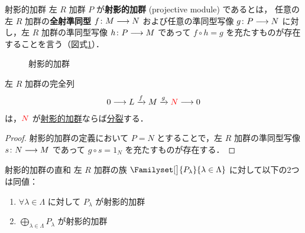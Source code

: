 \documentclass[rep_main]{subfiles}
\begin{document}

\begin{mydef}[label=def:proj-mod]{射影的加群}
    左 $R$ 加群 $P$ が\textbf{射影的加群} (projective module) であるとは，
    任意の左 $R$ 加群の\textbf{全射準同型} $f\colon M \longrightarrow N$ および任意の準同型写像 $g \colon P \longrightarrow N$ に対し，左 $R$ 加群の準同型写像 $ h \colon P \longrightarrow M$ であって $f \circ h = g$ を充たすものが存在することを言う（図式\ref{fig:proj-mod}）．
\end{mydef}

\begin{figure}[H]
    \centering
    \caption{射影的加群}
    \label{fig:proj-mod}
\end{figure}%

\begin{myprop}[label=prop:proj-mod-split]{}
    左 $R$ 加群の完全列
    \begin{align}
        0 \longrightarrow L \xrightarrow{f} M \xrightarrow{g} \textcolor{red}{N} \longrightarrow 0
    \end{align}
    は，$\textcolor{red}{N}$ が\hyperref[def:proj-mod]{射影的加群}ならば\hyperref[def:split]{分裂}する．
\end{myprop}

\begin{proof}
    射影的加群の定義において $P = N$ とすることで，左 $R$ 加群の準同型写像 $s \colon N \longrightarrow M$ であって $g \circ s = 1_N$ を充たすものが存在する．
\end{proof}

\begin{myprop}[label=prop:proj-mod-dp]{射影的加群の直和}
    左 $R$ 加群の族 $\Familyset[\big]{P_\lambda}{\lambda \in \Lambda}$ に対して以下の2つは同値：
    \begin{enumerate}
        \item $\forall \lambda \in \Lambda$ に対して $P_\lambda$ が射影的加群
        \item $\displaystyle\bigoplus_{\lambda \in \Lambda} P_\lambda$ が射影的加群
    \end{enumerate}
\end{myprop}
\end{document}
